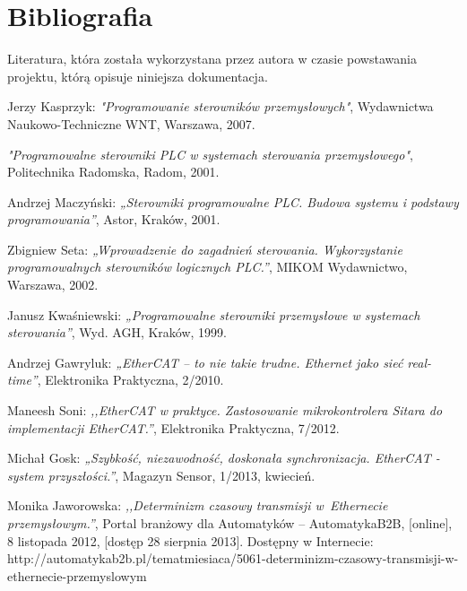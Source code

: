 \section{Bibliografia}
Literatura, która została wykorzystana przez autora w czasie powstawania projektu, którą opisuje niniejsza dokumentacja.

\begin{thebibliography}{99}
Jerzy Kasprzyk: 
\emph{"Programowanie sterowników przemysłowych"},
Wydawnictwa Naukowo-Techniczne WNT, 
Warszawa, 
2007.      

\emph{"Programowalne sterowniki PLC w systemach sterowania przemysłowego"}, 
Politechnika Radomska, 
Radom,
2001.

Andrzej Maczyński:
\emph{„Sterowniki programowalne PLC. Budowa systemu i podstawy programowania”},
Astor, 
Kraków,
2001. 

Zbigniew Seta: 
\emph{„Wprowadzenie do zagadnień sterowania. Wykorzystanie programowalnych sterowników logicznych PLC.”},
MIKOM Wydawnictwo, 
Warszawa,
2002. 

Janusz Kwaśniewski: 
\emph{„Programowalne sterowniki przemysłowe w systemach sterowania”}, 
Wyd. AGH, 
Kraków,
1999.

%
%
%

Andrzej Gawryluk:
\emph{„EtherCAT – to nie takie trudne. Ethernet jako sieć real-time”},
Elektronika Praktyczna, 2/2010.

Maneesh Soni:
\emph{,,EtherCAT w praktyce. Zastosowanie mikrokontrolera Sitara do implementacji EtherCAT.''},
Elektronika Praktyczna, 7/2012.

Michał Gosk:
\emph{„Szybkość, niezawodność, doskonała synchronizacja. EtherCAT - system przyszłości.”},
Magazyn Sensor, 1/2013, kwiecień.

Monika Jaworowska:
\emph{,,Determinizm czasowy transmisji w~Ethernecie przemysłowym.''},
Portal branżowy dla Automatyków -- AutomatykaB2B, 
[online],
8 listopada 2012,
[dostęp 28 sierpnia 2013].
Dostępny w Internecie: \\
http://automatykab2b.pl/tematmiesiaca/5061-determinizm-czasowy-transmisji-w-ethernecie-przemyslowym


\end{thebibliography}
